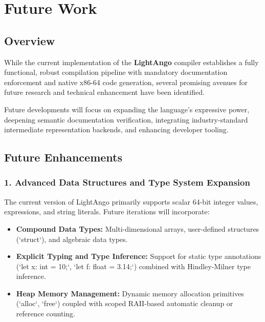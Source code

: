 \chapter{Future Work}\doublespacing

\section{Overview}
While the current implementation of the \textbf{LightAngo} compiler establishes a fully functional, robust compilation pipeline with mandatory documentation enforcement and native x86-64 code generation, several promising avenues for future research and technical enhancement have been identified.

Future developments will focus on expanding the language's expressive power, deepening semantic documentation verification, integrating industry-standard intermediate representation backends, and enhancing developer tooling.

\section{Future Enhancements}

\subsection{1. Advanced Data Structures and Type System Expansion}
The current version of LightAngo primarily supports scalar 64-bit integer values, expressions, and string literals. Future iterations will incorporate:
\begin{itemize}
    \item \textbf{Compound Data Types:} Multi-dimensional arrays, user-defined structures (`struct`), and algebraic data types.
    \item \textbf{Explicit Typing and Type Inference:} Support for static type annotations (`let x: int = 10;`, `let f: float = 3.14;`) combined with Hindley-Milner type inference.
    \item \textbf{Heap Memory Management:} Dynamic memory allocation primitives (`alloc`, `free`) coupled with scoped RAII-based automatic cleanup or reference counting.
\end{itemize}

